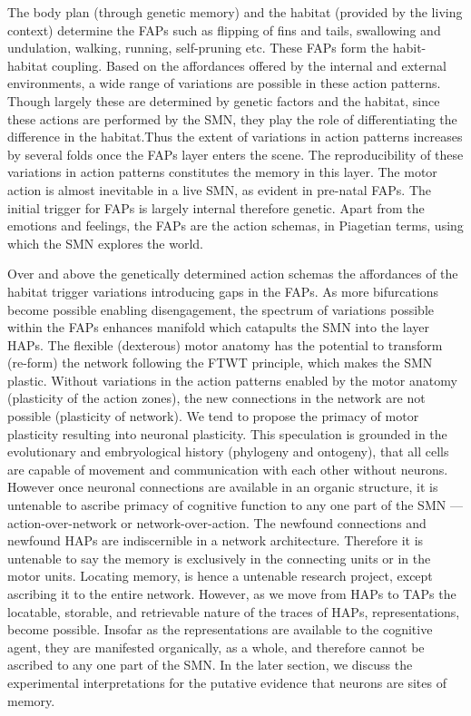 The body plan (through genetic memory) and the habitat (provided by the living context) determine the FAPs such as flipping of fins and tails, swallowing and undulation, walking, running, self-pruning etc. These FAPs form the habit-habitat coupling. Based on the affordances offered by the internal and external environments, a wide range of variations are possible in these action patterns. Though largely these are determined by genetic factors and the habitat, since these actions are performed by the SMN, they play the role of differentiating the difference in the habitat.Thus the extent of variations in action patterns increases by several folds once the FAPs layer enters the scene. The reproducibility of these variations in action patterns constitutes the memory in this layer. The motor action is almost inevitable in a live SMN, as evident in pre-natal FAPs. The initial trigger for FAPs is largely internal therefore genetic. Apart from the emotions and feelings, the FAPs are the action schemas, in Piagetian terms, using which the SMN explores the world.

Over and above the genetically determined action schemas the affordances of the habitat trigger variations introducing gaps in the FAPs. As more bifurcations become possible enabling disengagement, the spectrum of variations possible within the FAPs enhances manifold which catapults the SMN into the layer HAPs. The flexible (dexterous) motor anatomy has the potential to transform (re-form) the network following the FTWT principle, which makes the SMN plastic. Without variations in the action patterns enabled by the motor anatomy (plasticity of the action zones), the new connections in the network are not possible (plasticity of network). We tend to propose the primacy of motor plasticity resulting into neuronal plasticity. This speculation is grounded in the evolutionary and embryological history (phylogeny and ontogeny), that all cells are capable of movement and communication with each other without neurons. However once neuronal connections are available in an organic structure, it is untenable to ascribe primacy of cognitive function to any one part of the SMN --- action-over-network or network-over-action. The newfound connections and newfound HAPs are indiscernible in a network architecture. Therefore it is untenable to say the memory is exclusively in the connecting units or in the motor units. Locating memory, is hence a untenable research project, except ascribing it to the entire network. However, as we move from HAPs to TAPs the locatable, storable, and retrievable nature of the traces of HAPs, representations, become possible. Insofar as the representations are available to the cognitive agent, they are manifested organically, as a whole, and therefore cannot be ascribed to any one part of the SMN. In the later section, we discuss the experimental interpretations for the putative evidence that neurons are sites of memory.


